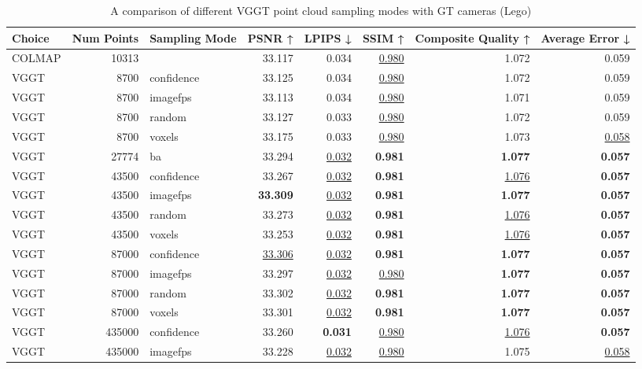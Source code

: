 \begin{table}[H]
\caption{\ifdefined\customcaption \customcaption \else A comparison of different VGGT point cloud sampling modes with GT cameras (Lego) \fi}
\label{tab:03_sampling_mode_gt_cams_lego}
\centering
\scriptsize
\begin{tabular}{lrlrrrrr}
\toprule
Choice & Num Points & Sampling Mode & PSNR ↑ & LPIPS ↓ & SSIM ↑ & Composite Quality ↑ & Average Error ↓ \\
\midrule
COLMAP & 10313 &  & 33.117 & 0.034 & \underline{0.980} & 1.072 & 0.059 \\
VGGT & 8700 & confidence & 33.125 & 0.034 & \underline{0.980} & 1.072 & 0.059 \\
VGGT & 8700 & imagefps & 33.113 & 0.034 & \underline{0.980} & 1.071 & 0.059 \\
VGGT & 8700 & random & 33.127 & 0.033 & \underline{0.980} & 1.072 & 0.059 \\
VGGT & 8700 & voxels & 33.175 & 0.033 & \underline{0.980} & 1.073 & \underline{0.058} \\
VGGT & 27774 & ba & 33.294 & \underline{0.032} & \textbf{0.981} & \textbf{1.077} & \textbf{0.057} \\
VGGT & 43500 & confidence & 33.267 & \underline{0.032} & \textbf{0.981} & \underline{1.076} & \textbf{0.057} \\
VGGT & 43500 & imagefps & \textbf{33.309} & \underline{0.032} & \textbf{0.981} & \textbf{1.077} & \textbf{0.057} \\
VGGT & 43500 & random & 33.273 & \underline{0.032} & \textbf{0.981} & \underline{1.076} & \textbf{0.057} \\
VGGT & 43500 & voxels & 33.253 & \underline{0.032} & \textbf{0.981} & \underline{1.076} & \textbf{0.057} \\
VGGT & 87000 & confidence & \underline{33.306} & \underline{0.032} & \textbf{0.981} & \textbf{1.077} & \textbf{0.057} \\
VGGT & 87000 & imagefps & 33.297 & \underline{0.032} & \underline{0.980} & \textbf{1.077} & \textbf{0.057} \\
VGGT & 87000 & random & 33.302 & \underline{0.032} & \textbf{0.981} & \textbf{1.077} & \textbf{0.057} \\
VGGT & 87000 & voxels & 33.301 & \underline{0.032} & \textbf{0.981} & \textbf{1.077} & \textbf{0.057} \\
VGGT & 435000 & confidence & 33.260 & \textbf{0.031} & \underline{0.980} & \underline{1.076} & \textbf{0.057} \\
VGGT & 435000 & imagefps & 33.228 & \underline{0.032} & \underline{0.980} & 1.075 & \underline{0.058} \\

\end{tabular}
\end{table}
